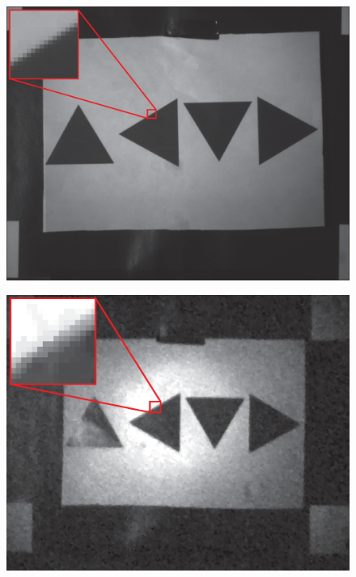 \begin{figure}[H]
    \centering
\begin{minipage}[t]{0.49\textwidth}
    \includegraphics[width=1\textwidth]{result/mtf/swir22.eps}
    \subcaption{}
    \label{fig:mtf_s2}
\end{minipage}
\begin{minipage}[t]{0.49\textwidth}
    \includegraphics[width=1\textwidth]{result/mtf/spc222.eps}
    \subcaption{}
    \label{fig:mtf_spc2}
\end{minipage}
\begin{minipage}[t]{0.49\textwidth}

\end{minipage}
\end{figure}

